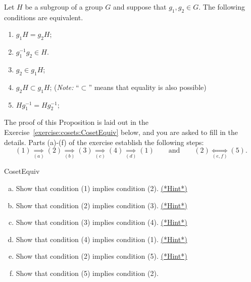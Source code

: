 \begin{thm}\label{cosets_theorem_1}
Let $H$ be a subgroup of a group $G$ and suppose that $g_1, g_2 \in G$.  The following conditions are equivalent.  
\begin{enumerate}
 
\item
$g_1 H = g_2 H$; 

\item
$g_1^{-1} g_2 \in H$.

\item
$g_2 \in g_1 H$; 

\item
$g_2 H \subset g_1 H$; \qquad (\emph{Note:} ``$\subset$'' means that equality is also possible)

\item
$H g_1^{-1}  = H g_2^{-1}$; 


 \end{enumerate}
\end{thm}
The proof of this Proposition is laid out in the Exercise~\ref{exercise:cosets:CosetEquiv} below, and you are asked to fill in the details. Parts (a)-(f) of the exercise establish the following steps:
\[ (1) \underset{(a)}\implies (2) \underset{(b)}\implies (3) \underset{(c)}\implies (4) \underset{(d)}\implies (1) \qquad \text{and} \qquad (2) \underset{(e,f)}\Leftrightarrow (5). \]


\begin{exercise}{CosetEquiv}
\begin{enumerate}[(a)]
\item
Show that condition (1) implies condition (2).  
\hyperref[sec:cosets:hints]{(*Hint*)}

\item
Show that condition (2) implies condition (3).
\hyperref[sec:cosets:hints]{(*Hint*)}


\item
Show that condition (3) implies condition (4).
\hyperref[sec:cosets:hints]{(*Hint*)}

\item
Show that condition (4) implies condition (1).
\hyperref[sec:cosets:hints]{(*Hint*)}

\item
Show that condition (2) implies condition (5).
\hyperref[sec:cosets:hints]{(*Hint*)}

\item
Show that condition (5) implies condition (2).
\end{enumerate}
\end{exercise}

